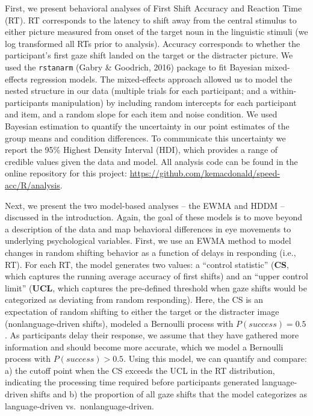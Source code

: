 \documentclass[10pt, letterpaper]{article}
\begin{document}
First, we present behavioral analyses of First Shift Accuracy and
Reaction Time (RT). RT corresponds to the latency to shift away from the
central stimulus to either picture measured from onset of the target
noun in the linguistic stimuli (we log transformed all RTs prior to
analysis). Accuracy corresponds to whether the participant's first gaze
shift landed on the target or the distracter picture. We used the
\texttt{rstanarm} (Gabry \& Goodrich, 2016) package to fit Bayesian
mixed-effects regression models. The mixed-effects approach allowed us
to model the nested structure in our data (multiple trials for each
participant; and a within-participants manipulation) by including random
intercepts for each participant and item, and a random slope for each
item and noise condition. We used Bayesian estimation to quantify the
uncertainty in our point estimates of the group means and condition
differences. To communicate this uncertainty we report the 95\% Highest
Density Interval (HDI), which provides a range of credible values given
the data and model. All analysis code can be found in the online
repository for this project:
\url{https://github.com/kemacdonald/speed-acc/R/analysis}.

Next, we present the two model-based analyses -- the EWMA and HDDM --
discussed in the introduction. Again, the goal of these models is to
move beyond a description of the data and map behavioral differences in
eye movements to underlying psychological variables. First, we use an
EWMA method to model changes in random shifting behavior as a function
of delays in responding (i.e., RT). For each RT, the model generates two
values: a ``control statistic'' (\textbf{CS}, which captures the running
average accuracy of first shifts) and an ``upper control limit''
(\textbf{UCL}, which captures the pre-defined threshold when gaze shifts
would be categorized as deviating from random responding). Here, the CS
is an expectation of random shifting to either the target or the
distracter image (nonlanguage-driven shifts), modeled a Bernoulli
process with \(P(success) = 0.5\). As participants delay their response,
we assume that they have gathered more information and should become
more accurate, which we model a Bernoulli process with
\(P(success) > 0.5\). Using this model, we can quantify and compare: a)
the cutoff point when the CS exceeds the UCL in the RT distribution,
indicating the processing time required before participants generated
language-driven shifts and b) the proportion of all gaze shifts that the
model categorizes as language-driven vs.~nonlanguage-driven.
\end{document}
